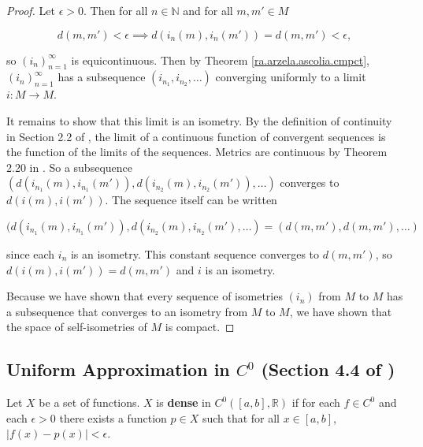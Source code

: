 \begin{proof}

Let \(\epsilon > 0\). Then for all \(n \in \mathbb{N}\) and for all \(m, m' \in M\)

\[
d(m, m') < \epsilon \implies d(i_n(m), i_n(m')) = d(m, m') < \epsilon,
\]

so \((i_n)_{n=1}^\infty\) is equicontinuous. Then by Theorem \ref{ra.arzela.ascolia.cmpct}, \((i_n)_{n=1}^\infty\) has a subsequence  \((i_{n_1}, i_{n_2}, \ldots)\) converging uniformly to a limit \(i: M \to M\).

It remains to show that this limit is an isometry. By the definition of continuity in Section 2.2 of \citet{pugh2015real}, the limit of a continuous function of convergent sequences is the function of the limits of the sequences. Metrics are continuous by Theorem 2.20 in \citet{pugh2015real}. So a subsequence \\ \((d(i_{n_1}(m), i_{n_1}(m')), d(i_{n_2}(m), i_{n_2}(m')), \ldots)\) converges to \(d(i(m), i(m'))\). The sequence itself can be written

\[
(d(i_{n_1}(m), i_{n_1}(m')), d(i_{n_2}(m), i_{n_2}(m'), \ldots) = (d(m, m'), d(m, m'), \ldots)
\]

since each \(i_n\) is an isometry. This constant sequence converges to \(d(m, m')\), so \(d(i(m), i(m')) = d(m, m')\) and \(i\) is an isometry.

Because we have shown that every sequence of isometries \((i_n)\) from \(M\) to \(M\) has a subsequence that converges to an isometry from \(M\) to \(M\), we have shown that the space of self-isometries of \(M\) is compact.


\end{proof}


\subsection{Uniform Approximation in \(C^0\) (Section 4.4 of \citet{pugh2015real})}

\begin{definition}\label{ra.defn.dense.2}

Let \(X\) be a set of functions. \(X\) is \textbf{dense} in \(C^0([a,b], \mathbb{R})\) if for each \(f \in  C^0\) and each \(\epsilon >0\) there exists a function \(p \in X\) such that for all \(x \in [a,b]\), \(|f(x) - p(x)| < \epsilon\). 

\end{definition}




